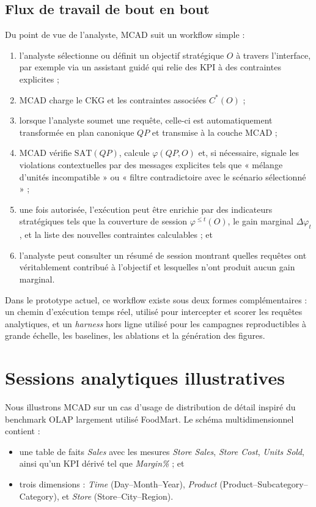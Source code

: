 \documentclass[journal]{IEEEtran}
\begin{document}
\subsection{Flux de travail de bout en bout}

Du point de vue de l'analyste, MCAD suit un workflow simple :
\begin{enumerate}
  \item l'analyste sélectionne ou définit un objectif stratégique $O$ à travers l'interface, par exemple via un assistant guidé qui relie des KPI à des contraintes explicites ;
  \item MCAD charge le CKG et les contraintes associées $C^*(O)$ ;
  \item lorsque l'analyste soumet une requête, celle-ci est automatiquement transformée en plan canonique $QP$ et transmise à la couche MCAD ;
  \item MCAD vérifie $\mathrm{SAT}(QP)$, calcule $\varphi(QP,O)$ et, si nécessaire, signale les violations contextuelles par des messages explicites tels que « mélange d'unités incompatible » ou « filtre contradictoire avec le scénario sélectionné » ;
  \item une fois autorisée, l'exécution peut être enrichie par des indicateurs stratégiques tels que la couverture de session $\varphi^{\le t}(O)$, le gain marginal $\Delta\varphi_t$, et la liste des nouvelles contraintes calculables ; et
  \item l'analyste peut consulter un résumé de session montrant quelles requêtes ont véritablement contribué à l'objectif et lesquelles n'ont produit aucun gain marginal.
\end{enumerate}

Dans le prototype actuel, ce workflow existe sous deux formes complémentaires : un chemin d'exécution temps réel, utilisé pour intercepter et scorer les requêtes analytiques, et un \emph{harness} hors ligne utilisé pour les campagnes reproductibles à grande échelle, les baselines, les ablations et la génération des figures.

\section{Sessions analytiques illustratives}
\label{sec:case}

Nous illustrons MCAD sur un cas d'usage de distribution de détail inspiré du benchmark OLAP largement utilisé FoodMart. Le schéma multidimensionnel contient :
\begin{itemize}
  \item une table de faits \textit{Sales} avec les mesures \textit{Store Sales}, \textit{Store Cost}, \textit{Units Sold}, ainsi qu'un KPI dérivé tel que \textit{Margin\%} ; et
  \item trois dimensions : \textit{Time} (Day--Month--Year), \textit{Product} (Product--Subcategory--Category), et \textit{Store} (Store--City--Region).
\end{itemize}
\end{document}
